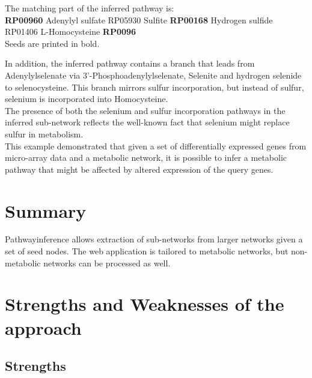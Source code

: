 The matching part of the inferred pathway is:\\
\textbf{RP00960} Adenylyl sulfate RP05930 Sulfite \textbf{RP00168} Hydrogen sulfide RP01406 L-Homocysteine \textbf{RP0096}\\
Seeds are printed in bold.

In addition, the inferred pathway contains a branch that leads
from Adenylylselenate via 3'-Phosphoadenylylselenate, Selenite and hydrogen selenide to selenocysteine.
This branch mirrors sulfur incorporation, but instead of sulfur, selenium is incorporated into Homocysteine.\\

The presence of both the selenium and sulfur incorporation pathways in the inferred sub-network
reflects the well-known fact that selenium might replace sulfur in metabolism.\\

This example demonstrated that given a set of differentially expressed genes from
micro-array data and a metabolic network, it is possible to infer a metabolic pathway
that might be affected by altered expression of the query genes.

\section{Summary}

Pathwayinference allows extraction of sub-networks from larger networks given a set of seed nodes. The web application
is tailored to metabolic networks, but non-metabolic networks can be processed as well.

\section{Strengths and Weaknesses of the approach}

\subsection{Strengths}

